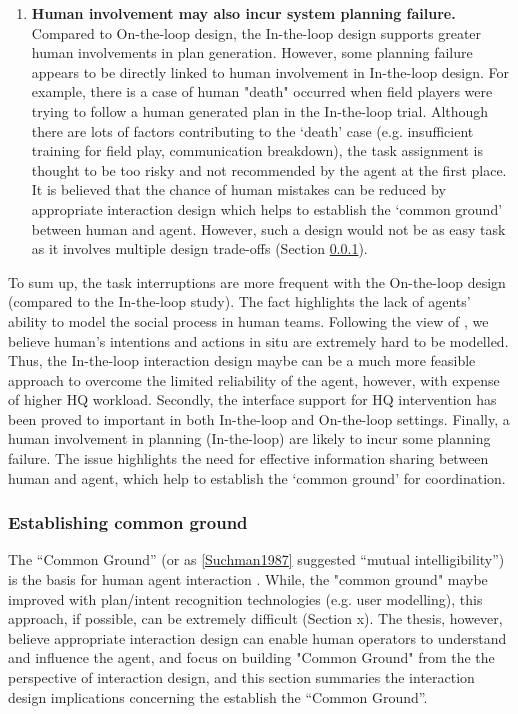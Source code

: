 \begin{enumerate}
\item \textbf{Human involvement may also incur system planning failure.} \\
Compared to On-the-loop design, the In-the-loop design supports greater human involvements in plan generation. However, some planning failure appears to be directly linked to human involvement in In-the-loop design. For example, there is a case of  human "death" occurred  when field players were trying to follow a human generated plan in the In-the-loop trial.  Although there are lots of factors contributing to the `death' case (e.g. insufficient training for field play, communication breakdown), the task assignment is thought to be too risky and not recommended by the agent at the first place. It is believed that the chance of human mistakes can be reduced by appropriate interaction design which helps to establish the `common ground' between human and agent. However, such a design would not be as easy task as it involves multiple design trade-offs  (Section \ref{sec:conclusionCG}).
\end{enumerate}

To sum up, the task interruptions are more frequent with the On-the-loop design (compared to the In-the-loop study). The fact highlights the lack of agents' ability to model the social process in human teams. Following the view of \cite{Suchman1987}, we believe human's intentions and actions in situ are extremely hard to be modelled. Thus, the In-the-loop interaction design maybe can be a much more feasible approach to overcome the limited reliability of the agent, however, with expense of higher HQ workload. Secondly, the interface support for HQ intervention has been proved to important in both In-the-loop and On-the-loop settings. Finally, a human involvement in planning (In-the-loop) are likely to incur some planning failure. The issue highlights the need for effective information sharing between human and agent, which help to establish the `common ground' for coordination. \\


\subsubsection{Establishing common ground} \label{sec:conclusionCG}
The ``Common Ground'' (or as \ref{Suchman1987} suggested ``mutual intelligibility'') is the basis for human agent interaction \cite{Bradshaw2011}.  While, the "common ground" maybe improved with plan/intent recognition technologies (e.g. user modelling), this approach, if possible, can be extremely difficult (Section x). The thesis, however, believe appropriate interaction design can enable human operators to understand and influence the agent, and focus on building "Common Ground" from the the perspective of interaction design, and this section summaries the interaction design implications concerning the establish the  ``Common Ground''.\\


